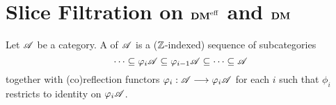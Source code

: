 \newpage
\section{Slice Filtration on $\mathbf{DM}^{\mathrm{eff}}$ and $\mathbf{DM}$}\label{sect_slice_filt_dm}

\begin{defn}\label{def_cat_filtration}
Let $\mathscr{A}$ be a category. A  of $\mathscr{A}$ 
is a ($\mathbb{Z}$-indexed) sequence of subcategories
\[
\cdots \subseteq \varphi_i\mathscr{A} \subseteq \varphi_{i - 1}\mathscr{A} \subseteq \cdots 
   \subseteq \mathscr{A}
\]
together with (co)reflection functors $\varphi_i: \mathscr{A} \longrightarrow 
\varphi_i\mathscr{A}$ for each $i$ such that $\phi_i$ restricts to 
identity on $\varphi_i\mathscr{A}$.
\end{defn}
